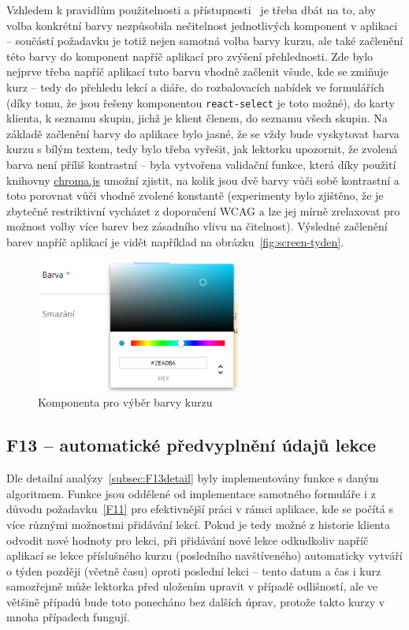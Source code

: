 Vzhledem k pravidlům použitelnosti a přístupnosti~\cite{wcag} je třeba dbát na to, aby volba konkrétní barvy nezpůsobila nečitelnost jednotlivých komponent v aplikaci -- součástí požadavku je totiž nejen samotná volba barvy kurzu, ale také začlenění této barvy do komponent napříč aplikací pro zvýšení přehlednosti. Zde bylo nejprve třeba napříč aplikací tuto barvu vhodně začlenit všude, kde se zmiňuje kurz -- tedy do přehledu lekcí a diáře, do rozbalovacích nabídek ve formulářích (díky tomu, že jsou řešeny komponentou \verb|react-select| je toto možné), do karty klienta, k seznamu skupin, jichž je klient členem, do seznamu všech skupin. Na základě začlenění barvy do aplikace bylo jasné, že se vždy bude vyskytovat barva kurzu s bílým textem, tedy bylo třeba vyřešit, jak lektorku upozornit, že zvolená barva není příliš kontrastní -- byla vytvořena validační funkce, která díky použití knihovny \href{https://github.com/gka/chroma.js/}{chroma.js} umožní zjistit, na kolik jsou dvě barvy vůči sobě kontrastní a toto porovnat vůči vhodně zvolené konstantě (experimenty bylo zjištěno, že je zbytečně restriktivní vycházet z doporučení WCAG a lze jej mírně zrelaxovat pro možnost volby více barev bez zásadního vlivu na čitelnost). Výsledné začlenění barev napříč aplikací je vidět například na obrázku~\ref{fig:screen-tyden}.

\begin{figure}[h]\centering
    \includegraphics[width=0.6\textwidth]{img/ui-screen-barva.png}
    \caption{Komponenta pro výběr barvy kurzu}\label{fig:ui-screen-barva}
\end{figure}

\subsection{F13 -- automatické předvyplnění údajů lekce}

Dle detailní analýzy~\ref{subsec:F13detail} byly implementovány funkce s daným algoritmem. Funkce jsou oddělené od implementace samotného formuláře i z důvodu požadavku~\ref{F11} pro efektivnější práci v rámci aplikace, kde se počítá s více různými možnostmi přidávání lekcí. Pokud je tedy možné z historie klienta odvodit nové hodnoty pro lekci, při přidávání nové lekce odkudkoliv napříč aplikací se lekce příslušného kurzu (posledního navštíveného) automaticky vytváří o týden později (včetně času) oproti poslední lekci -- tento datum a čas i kurz samozřejmě může lektorka před uložením upravit v případě odlišností, ale ve většině případů bude toto ponecháno bez dalších úprav, protože takto kurzy v mnoha případech fungují. 

